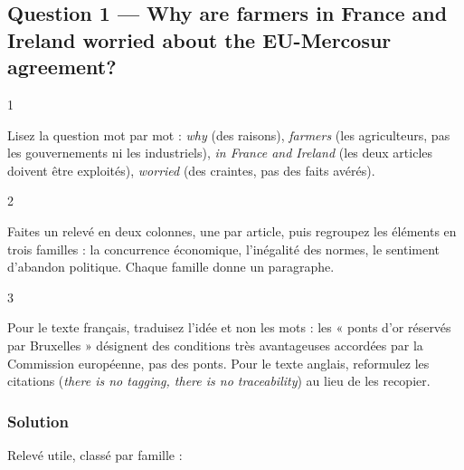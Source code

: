 \documentclass[11pt,a4paper]{article}
\begin{document}
\hypertarget{question-1-why-are-farmers-in-france-and-ireland-worried-about-the-eu-mercosur-agreement}{%
\subsection{Question 1 --- Why are farmers in France and Ireland worried about the EU-Mercosur agreement?}\label{question-1-why-are-farmers-in-france-and-ireland-worried-about-the-eu-mercosur-agreement}}

\begin{indication}{1}

Lisez la question mot par mot : \emph{why} (des raisons), \emph{farmers} (les agriculteurs, pas les gouvernements ni les industriels), \emph{in France and Ireland} (les deux articles doivent être exploités), \emph{worried} (des craintes, pas des faits avérés).

\end{indication}

\begin{indication}{2}

Faites un relevé en deux colonnes, une par article, puis regroupez les éléments en trois familles : la concurrence économique, l'inégalité des normes, le sentiment d'abandon politique. Chaque famille donne un paragraphe.

\end{indication}

\begin{indication}{3}

Pour le texte français, traduisez l'idée et non les mots : les « ponts d'or réservés par Bruxelles » désignent des conditions très avantageuses accordées par la Commission européenne, pas des ponts. Pour le texte anglais, reformulez les citations (\emph{there is no tagging, there is no traceability}) au lieu de les recopier.

\end{indication}

\hypertarget{solution}{%
\subsubsection{Solution}\label{solution}}

Relevé utile, classé par famille :
\end{document}

